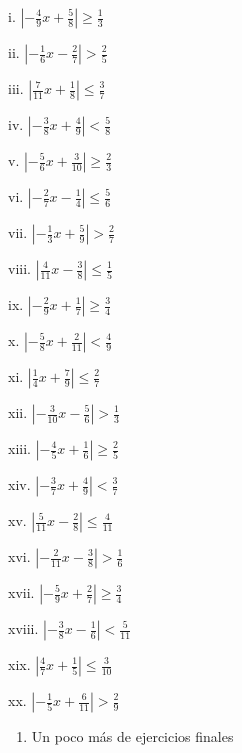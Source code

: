 \documentclass[]{book}
\providecommand{\tightlist}{%
  \setlength{\itemsep}{0pt}\setlength{\parskip}{0pt}}
\begin{document}
\begin{multicols}{2}
    i. $|{-\frac{4}{9}x+\frac{5}{8}}| \geq \frac{1}{3}$
    
    ii. $|{-\frac{1}{6}x-\frac{2}{7}}| > \frac{2}{5}$
    
    iii. $|{\frac{7}{11}x+\frac{1}{8}}| \leq \frac{3}{7}$
    
    iv. $|{-\frac{3}{8}x+\frac{4}{9}}| < \frac{5}{8}$
    
    v. $|{-\frac{5}{6}x+\frac{3}{10}}| \geq \frac{2}{3}$
    
    vi. $|{-\frac{2}{7}x-\frac{1}{4}}| \leq \frac{5}{6}$
    
    vii. $|{-\frac{1}{3}x+\frac{5}{9}}| > \frac{2}{7}$
    
    viii. $|{\frac{4}{11}x-\frac{3}{8}}| \leq \frac{1}{5}$
    
    ix. $|{-\frac{2}{9}x+\frac{1}{7}}| \geq \frac{3}{4}$
    
    x. $|{-\frac{5}{8}x+\frac{2}{11}}| < \frac{4}{9}$
    
    xi. $|{\frac{1}{4}x+\frac{7}{9}}| \leq \frac{2}{7}$
    
    xii. $|{-\frac{3}{10}x-\frac{5}{6}}| > \frac{1}{3}$
    
    xiii. $|{-\frac{4}{5}x+\frac{1}{6}}| \geq \frac{2}{5}$
    
    xiv. $|{-\frac{3}{7}x+\frac{4}{9}}| < \frac{3}{7}$
    
    xv. $|{\frac{5}{11}x-\frac{2}{8}}| \leq \frac{4}{11}$
    
    xvi. $|{-\frac{2}{11}x-\frac{3}{8}}| > \frac{1}{6}$
    
    xvii. $|{-\frac{5}{9}x+\frac{2}{7}}| \geq \frac{3}{4}$
    
    xviii. $|{-\frac{3}{8}x-\frac{1}{6}}| < \frac{5}{11}$
    
    xix. $|{\frac{4}{7}x+\frac{1}{5}}| \leq \frac{3}{10}$
    
    xx. $|{-\frac{1}{5}x+\frac{6}{11}}| > \frac{2}{9}$
\end{multicols}

\begin{enumerate}
\def\labelenumi{\arabic{enumi}.}
\setcounter{enumi}{3}
\tightlist
\item
  Un poco más de ejercicios finales
\end{enumerate}
\end{document}
